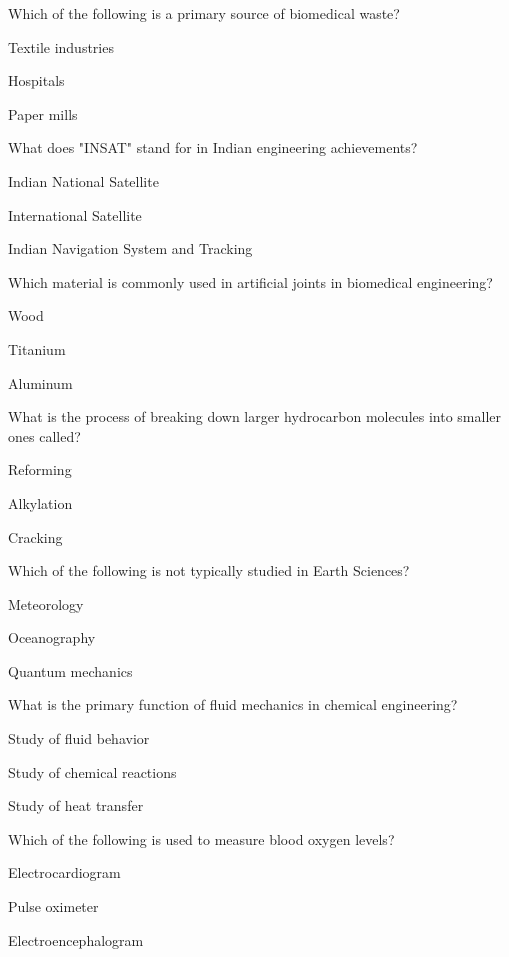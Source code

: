 \begin{enhancedmcq}{Which of the following is a primary source of biomedical waste?}
\item Textile industries
\item Hospitals
\item Paper mills

\end{enhancedmcq}
\begin{enhancedmcq}{What does "INSAT" stand for in Indian engineering achievements?}
\item Indian National Satellite
\item International Satellite
\item Indian Navigation System and Tracking

\end{enhancedmcq}
\begin{enhancedmcq}{Which material is commonly used in artificial joints in biomedical engineering?}
\item Wood
\item Titanium
\item Aluminum

\end{enhancedmcq}
\begin{enhancedmcq}{What is the process of breaking down larger hydrocarbon molecules into smaller ones called?}
\item Reforming
\item Alkylation
\item Cracking

\end{enhancedmcq}
\begin{enhancedmcq}{Which of the following is not typically studied in Earth Sciences?}
\item Meteorology
\item Oceanography
\item Quantum mechanics

\end{enhancedmcq}
\begin{enhancedmcq}{What is the primary function of fluid mechanics in chemical engineering?}
\item Study of fluid behavior
\item Study of chemical reactions
\item Study of heat transfer

\end{enhancedmcq}
\begin{enhancedmcq}{Which of the following is used to measure blood oxygen levels?}
\item Electrocardiogram
\item Pulse oximeter
\item Electroencephalogram

\end{enhancedmcq}
